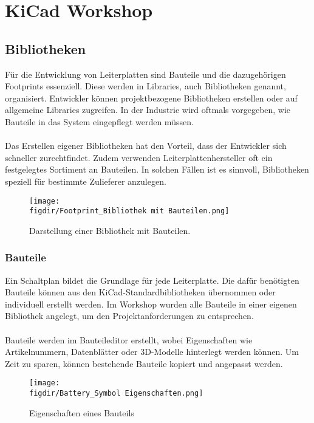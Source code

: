 \section{KiCad Workshop}  

\subsection{Bibliotheken}  
Für die Entwicklung von Leiterplatten sind Bauteile und die dazugehörigen Footprints essenziell.
Diese werden in Libraries, auch Bibliotheken genannt, organisiert. Entwickler können projektbezogene Bibliotheken erstellen oder auf allgemeine Libraries zugreifen.
In der Industrie wird oftmals vorgegeben, wie Bauteile in das System eingepflegt werden müssen.\\  
\\
Das Erstellen eigener Bibliotheken hat den Vorteil, dass der Entwickler sich schneller zurechtfindet.
Zudem verwenden Leiterplattenhersteller oft ein festgelegtes Sortiment an Bauteilen.
In solchen Fällen ist es sinnvoll, Bibliotheken speziell für bestimmte Zulieferer anzulegen.  

\begin{figure}[h]  
    \centering  
    \texttt{[image: \\figdir/Footprint\_Bibliothek mit Bauteilen.png]}  
    \caption{Darstellung einer Bibliothek mit Bauteilen.} 
    \label{fig:Abbildung 5} 
\end{figure}  

\subsubsection{Bauteile}  
Ein Schaltplan bildet die Grundlage für jede Leiterplatte.
Die dafür benötigten Bauteile können aus den KiCad-Standardbibliotheken übernommen oder individuell erstellt werden.
Im Workshop wurden alle Bauteile in einer eigenen Bibliothek angelegt, um den Projektanforderungen zu entsprechen.\\
\\
Bauteile werden im Bauteileditor erstellt, wobei Eigenschaften wie Artikelnummern, Datenblätter oder 3D-Modelle hinterlegt werden können.
Um Zeit zu sparen, können bestehende Bauteile kopiert und angepasst werden.  

\begin{figure}[h]  
    \centering  
    \texttt{[image: \\figdir/Battery\_Symbol Eigenschaften.png]}  
    \caption{Eigenschaften eines Bauteils}  
    \label{fig:Abbildung 6}
\end{figure}  

